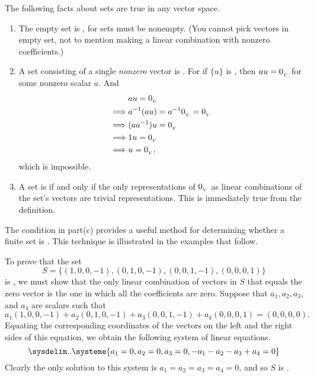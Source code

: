 \begin{additional theorem} \label{athm 1.15}
The following facts about \LID{} sets are true in any vector space.
\begin{enumerate}
\item The empty set is \LID{}, for \LDP{} sets must be nonempty. (You cannot pick vectors in empty set, not to mention making a linear combination with nonzero coefficients.)  
\item A set consisting of a single \emph{nonzero} vector is \LID{}.
      For if \(\{ u \}\) is \LDP{}, then \(a u = 0_{_V}\) for some nonzero scalar \(a\).
      And
      \begin{align*}
                   & a u = 0_{_V} \\
          \implies & a^{-1} (a u ) = a^{-1} 0_{_V} = 0_{_V} \\
          \implies & (a a^{-1}) u = 0_{_V} \\
          \implies & 1 u = 0_{_V} \\
          \implies & u = 0_{_V},
      \end{align*}
      which is impossible.
\item A set is \LID{} if and only if the only representations of \(0_{_V}\) as linear combinations of the set's vectors are trivial representations.
      This is immediately true from the definition.
\end{enumerate}

The condition in part(c) provides a useful method for determining whether a finite set is \LID{}.
This technique is illustrated in the examples that follow.
\end{additional theorem}

\begin{example} \label{example 1.5.3}
To prove that the set
\[
    S = \{(1 , 0, 0, -1), (0, 1, 0, -1), (0, 0, 1, -1), (0, 0, 0, 1)\}
\]
is \LID{}, we must show that the only linear combination of vectors in \(S\) that equals the zero vector is the one in which all the coefficients are zero.
Suppose that \(a_1, a_2, a_3\), and \(a_4\) are scalars such that
\[
    a_1 (1, 0, 0, -1) + a_2(0, 1, 0, -1) + a_3(0, 0, 1, -1) + a_4(0, 0, 0, 1) = (0, 0, 0, 0).
\]
Equating the corresponding coordinates of the vectors on the left and the right sides of this equation, we obtain the following system of linear equations.
\begin{equation*}
\sysdelim..\systeme{
    a_1 = 0,
    a_2 = 0,
    a_3 = 0,
    -a_1 - a_2 - a_3 + a_4 = 0}
\end{equation*}
Clearly the only solution to this system is \(a_1 = a_2 = a_3 = a_4 = 0\), and so \(S\) is \LID{}.
\end{example}

